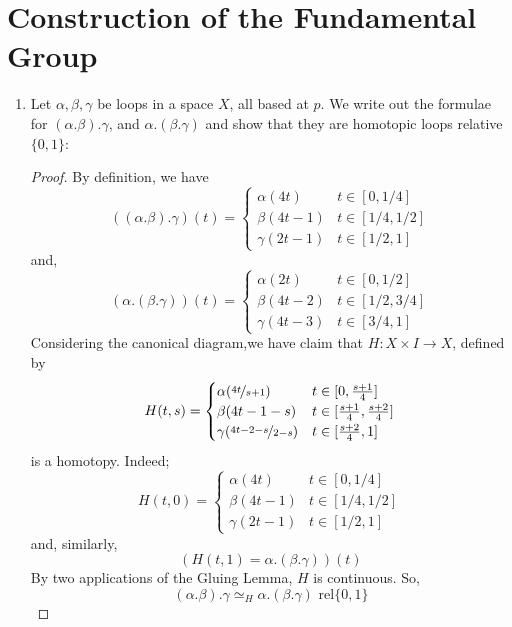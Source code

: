 \documentclass{book}
\begin{document}
\section{Construction of the Fundamental Group}
\begin{enumerate}[(1)]
    \item Let $\alpha, \beta, \gamma$ be loops in a space $X$, all based at $p$. We write out the formulae for $(\alpha.\beta).\gamma$, and $\alpha.(\beta.\gamma)$ and show that they are homotopic loops relative $\{0,1\}$: 
        \begin{proof} By definition, we have 
            \[((\alpha . \beta). \gamma)(t) = 
            \begin{cases} 
                \alpha(4t) & t \in [0, 1/4] \\
                \beta(4t -1) & t \in [1/4,1/2] \\
                \gamma(2t -1) & t \in [1/2,1]
            \end{cases} 
            \]                            
            and,
            \[ (\alpha.(\beta.\gamma))(t) = 
            \begin{cases}
                \alpha(2t) & t \in [0,1/2] \\
                \beta(4t-2) & t \in [1/2,3/4] \\
                \gamma(4t-3) & t \in [3/4,1] 
            \end{cases}
            \]
            Considering the canonical diagram,we have claim that $H: X \times I \rightarrow X$, defined by
            \[ H(t,s) = 
            \begin{cases}
                \alpha(\nicefrac{4t}{s+1}) & t \in [0, \frac{s+1}{4}] \\
                \beta(4t-1-s) & t \in [ \frac{s+1}{4}, \frac{s +2}{4}] \\
                \gamma(\nicefrac{4t-2-s}{2-s}) & t \in [\frac{s+2}{4}, 1] 
            \end{cases}
            \]
            is a homotopy. Indeed; 
            \[H(t,0) = 
            \begin{cases}
                \alpha(4t) & t \in [0, 1/4] \\
                \beta(4t -1) & t \in [1/4,1/2] \\
                \gamma(2t -1) & t \in [1/2,1]                        
            \end{cases}
            \]
            and, similarly, 
            \[ (H(t,1) = \alpha.(\beta.\gamma)) (t) \]
            By two applications of the Gluing Lemma, $H$ is continuous. So, 
            \[(\alpha.\beta). \gamma \simeq_H \alpha.(\beta.\gamma) \text{ rel} \{0,1\}\]
        \end{proof}


\end{enumerate}
\end{document}
